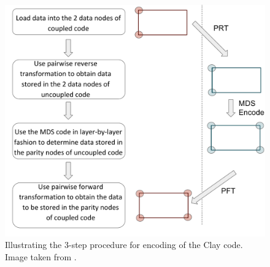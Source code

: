\bigskip

 	\begin{figure}[ht!]
 		\centering
 		\includegraphics[scale=.58]{src/Figures/chap4/encoding42}  
 		\caption{Illustrating the $3$-step procedure for encoding of the Clay code.  Image taken from \cite{VajhaFAST18}.}  \label{fig:encoding42}    
 	\end{figure}


\newpage

